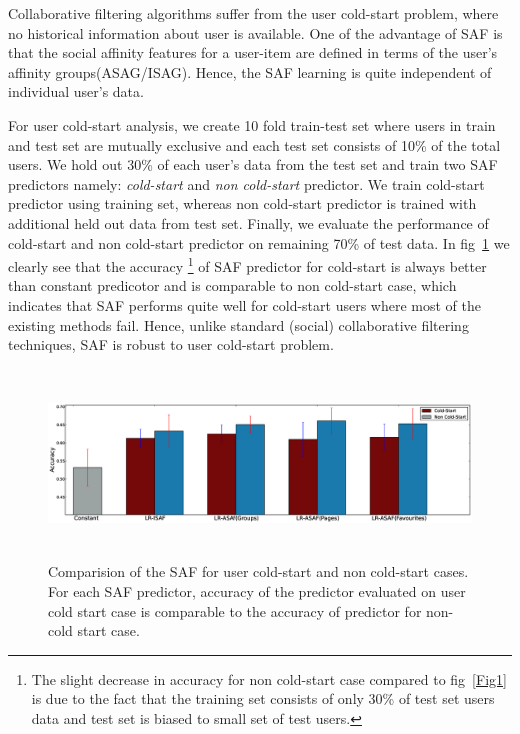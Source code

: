 Collaborative filtering algorithms suffer from the user cold-start problem,
where no historical information about user is available. One of the advantage of SAF is that 
the social affinity features for a user-item are defined in terms of the user's affinity groups(ASAG/ISAG).
Hence, the SAF learning is quite independent of individual user's data. 

For user cold-start analysis, we create 10 fold train-test set where users in train and test set are mutually exclusive
and each test set consists of 10\% of the total users. We hold out 30\% of each user's data from the test set 
and train two SAF predictors namely: \textit{cold-start} and \textit{non cold-start} predictor.
We train cold-start predictor using training set, whereas non cold-start predictor is trained with additional 
held out data from test set. Finally, we evaluate the performance of cold-start and non cold-start predictor on remaining 70\% 
of test data. In fig~\ref{fig:coldstart} we clearly see that the accuracy \footnote{ The slight decrease in accuracy for non cold-start case compared to 
fig~\ref{Fig1} is due to the fact that the training set consists of only 30\% of test set users data and test 
set is biased to small set of test users.} of  SAF predictor for cold-start is always better than constant predicotor and is comparable
to non cold-start case, which indicates that SAF performs quite well for cold-start users where most of the
existing methods fail.  Hence, unlike standard (social) collaborative filtering techniques, SAF is robust to user 
cold-start problem.  


\begin{figure}[tbp!]
\centering
\includegraphics[width=180mm,height=50mm]{data/plots/new/cold_start.eps}
\vspace{-3mm}
\caption{Comparision of the SAF for user cold-start and non cold-start cases.
For each SAF predictor, accuracy of the predictor evaluated on user
cold start case is comparable to the accuracy of predictor for non-cold start case.}
\label{fig:coldstart}
\end{figure}
 
